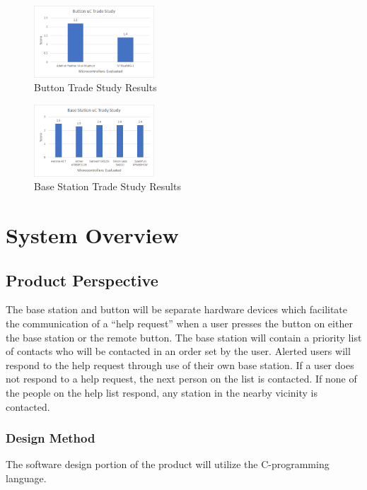 \documentclass[journal,compsoc]{IEEEtran}
\begin{document}
\begin{figure}[ht] 	%
\centering
\includegraphics[width=0.4\textwidth]{ButtonTS.png}
\caption{ \space Button Trade Study Results}
\label{HaHa Button TS}
\end{figure}

\begin{figure}[ht] 	%
\centering
\includegraphics[width=0.4\textwidth]{BaseTS.png}
\caption{ \space Base Station Trade Study Results}
\label{HaHa Base TS}
\end{figure}

\section{System Overview}

\subsection{Product Perspective}
The base station and button will be separate hardware devices which facilitate the communication of a “help request” when a user presses the button on either the base station or the remote button. The base station will contain a priority list of contacts who will be contacted in an order set by the user. Alerted users will respond to the help request through use of their own base station.  If a user does not respond to a help request, the next person on the list is contacted. If none of the people on the help list respond, any station in the nearby vicinity is contacted.

\subsubsection{Design Method}
The software design portion of the product will utilize the C-programming language.
\end{document}
